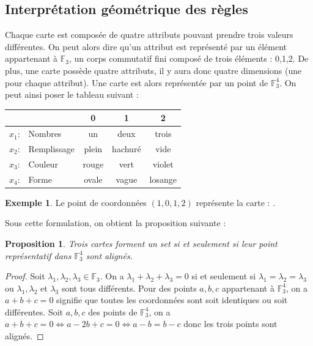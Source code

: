 \documentclass[a4paper,12pt,titlepage]{article}
\theoremstyle{plain}
\newtheorem{prop}{Proposition}
\newcommand{\Ftrois}[1]{\mathbb{F}^#1_3}
\theoremstyle{definition}
\newtheorem{ex}{Exemple}
\begin{document}
\subsection{Interprétation géométrique des règles}
Chaque carte est composée de quatre attributs pouvant prendre trois valeurs différentes. On peut alors dire qu'un attribut est représenté par un élément appartenant  à $\mathbb{F}_3$, un corps commutatif fini composé de trois éléments : 0,1,2.
De plus, une carte possède quatre attributs, il y aura donc quatre dimensions (une pour chaque attribut). Une carte est alors représentée par un point de $\Ftrois{4}$. On peut ainsi poser le tableau suivant :

\begin{center}
\begin{tabular}{r l | c c c }
 & & 0 & 1 & 2 \\
\hline
$x_1$: & Nombres     & un		& deux	  & trois 	\\
$x_2$: & Remplissage & plein 	& hachuré & vide 	\\
$x_3$: & Couleur     & rouge	& vert	  & violet 	\\
$x_4$: & Forme       & ovale	& vague	  & losange \\
\end{tabular}
\end{center}

\begin{ex}
Le point de coordonnées $(1,0,1,2)$ représente la carte : .
\end{ex}

Sous cette formulation, on obtient la proposition suivante :
\begin{prop}
Trois cartes forment un set si et seulement si leur point représentatif dans  $\Ftrois{4}$ sont alignés.
\end{prop}
\begin{proof}
Soit $\lambda_1,\lambda_2,\lambda_3 \in \mathbb{F}_3$. On a $\lambda_1 + \lambda_2 + \lambda_3 = 0$ si et seulement si $\lambda_1=\lambda_2=\lambda_3$ ou $\lambda_1,\lambda_2$ et $\lambda_3$ sont tous différents. Pour des points $a,b,c$ appartenant à  $\Ftrois{4}$, on a $a+b+c=0$ signifie que toutes les coordonnées sont soit identiques ou soit différentes.
Soit $a,b,c$ des points de  $\Ftrois{4}$, on a $a+b+c=0 \iff a-2b+c=0 \iff a-b=b-c$ donc les trois points sont alignés.
\end{proof}
\end{document}
